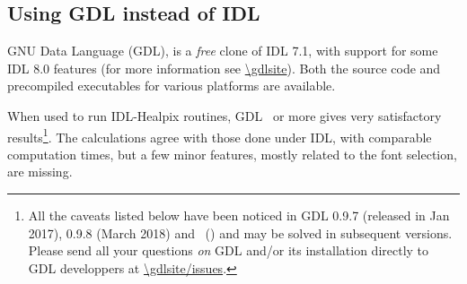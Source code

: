 \documentclass[12pt,twoside]{article}
\makeatletter
\newcommand{\nop}[1]{\Hy@raisedlink{\hypertarget{#1}{}}}
\newcommand{\mytarget}[1]{\nop{#1}}%
\newcommand{\mytarget}[1]{\label{#1}}
\makeatother
\begin{document}

\subsection{Using GDL instead of IDL}
\label{sec:using_gdl}
\label{install:using_gdl}
\mytarget{install:using_gdl}

GNU Data Language (GDL), is a {\em free} clone of IDL 7.1, with support for some IDL 8.0 features (for more information see
\url{\gdlsite}).
Both the source code and precompiled executables for various platforms are available.

When used to run IDL-Healpix routines, GDL \gdlversion\ or more gives
very satisfactory results\footnote{All the caveats listed below have been noticed in
GDL 0.9.7 (released in Jan 2017), 
0.9.8 (March 2018) and 
\gdlversion\ (\gdlreldate) and may be solved in subsequent versions. Please send all your questions
{\em on} GDL and/or its installation directly to GDL developpers at 
\url{\gdlsite/issues}.}. 
The calculations agree with those done under IDL, with
comparable computation times, but a few minor features, mostly related to the font selection, are missing.
\end{document}
